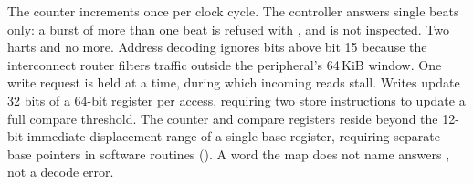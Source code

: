 The counter increments once per clock cycle. The controller answers
single beats only: a burst of more than one beat is refused with
, and  is not inspected. Two harts and no
more. Address decoding ignores bits above bit 15 because
the interconnect router filters traffic outside the peripheral's 64\,KiB window.
One write request is held at a time, during which incoming reads stall.
Writes update 32 bits of a 64-bit register per access, requiring two store
instructions to update a full compare threshold. The counter and compare registers
reside beyond the 12-bit immediate displacement range of a single base register,
requiring separate base pointers in software routines ().
A word the map does not name answers , not a decode error.
